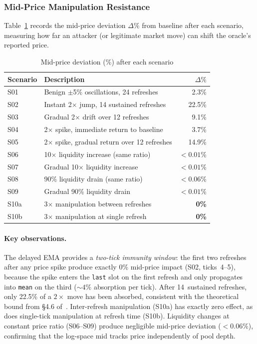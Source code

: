 \documentclass[10pt,a4paper,twocolumn]{article}
\begin{document}
\subsubsection{Mid-Price Manipulation Resistance}

Table~\ref{tab:scenario-mid} records the mid-price deviation $\Delta\%$ from baseline after each scenario, measuring how far an attacker (or legitimate market move) can shift the oracle's reported price.

\begin{table}[H]
\centering
\small
\caption{Mid-price deviation (\%) after each scenario}
\label{tab:scenario-mid}
\begin{tabularx}{0.95\columnwidth}{@{}l X r@{}}
\toprule
Scenario & Description & $\Delta\%$ \\
\midrule
S01 & Benign $\pm$5\% oscillations, 24 refreshes & 2.3\% \\
S02 & Instant 2$\times$ jump, 14 sustained refreshes & 22.5\% \\
S03 & Gradual 2$\times$ drift over 12 refreshes & 9.1\% \\
S04 & 2$\times$ spike, immediate return to baseline & 3.7\% \\
S05 & 2$\times$ spike, gradual return over 12 refreshes & 14.9\% \\
S06 & 10$\times$ liquidity increase (same ratio) & ${<}0.01$\% \\
S07 & Gradual 10$\times$ liquidity increase & ${<}0.01$\% \\
S08 & 90\% liquidity drain (same ratio) & ${<}0.06$\% \\
S09 & Gradual 90\% liquidity drain & ${<}0.01$\% \\
S10a & 3$\times$ manipulation between refreshes & \textbf{0\%} \\
S10b & 3$\times$ manipulation at single refresh & \textbf{0\%} \\
\bottomrule
\end{tabularx}
\end{table}

\paragraph{Key observations.}
The delayed EMA provides a \emph{two-tick immunity window}: the first two refreshes after any price spike produce exactly 0\% mid-price impact (S02, ticks~4--5), because the spike enters the \texttt{last} slot on the first refresh and only propagates into \texttt{mean} on the third (${\sim}4\%$ absorption per tick). After 14~sustained refreshes, only 22.5\% of a $2\times$ move has been absorbed, consistent with the theoretical bound from \S4.6 of~\cite{wp}. Inter-refresh manipulation (S10a) has exactly zero effect, as does single-tick manipulation at refresh time (S10b). Liquidity changes at constant price ratio (S06--S09) produce negligible mid-price deviation ($<$0.06\%), confirming that the log-space mid tracks price independently of pool depth.
\end{document}
